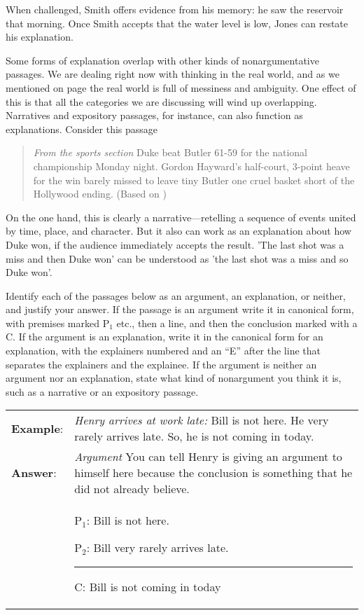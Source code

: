 When challenged, Smith offers evidence from his memory: he saw the reservoir that morning. Once Smith accepts that the water level is low, Jones can restate his explanation.

Some forms of explanation overlap with other kinds of nonargumentative passages. We are dealing right now with thinking in the real world, and as we mentioned on page \pageref{messiness_warning} the real world is full of messiness and ambiguity. One effect of this is that all the categories we are discussing will wind up overlapping. Narratives and expository passages, for instance, can also function as explanations. Consider this passage

\begin{quotation} \noindent\textit{From the sports section} Duke beat Butler 61-59 for the national championship Monday night. Gordon Hayward's half-court, 3-point heave for the win barely missed to leave tiny Butler one cruel basket short of the Hollywood ending. (Based on \cite{AP2010}) \end{quotation}

On the one hand, this is clearly a narrative---retelling a sequence of events united by time, place, and character. But it also can work as an explanation about how Duke won, if the audience immediately accepts the result. 'The last shot was a miss\textit{ }and then Duke won' can be understood as 'the last shot was a miss and so Duke won'.




\practiceproblems 
\problempart Identify each of the passages below as an argument, an explanation, or neither, and justify your answer. If the passage is an argument write it in canonical form, with premises marked P$_1$ etc., then a line, and then the conclusion marked with a C. If the argument is an explanation, write it in the canonical form for an explanation, with the explainers numbered and an ``E'' after the line that separates the explainers and the explainee. If the argument is neither an argument nor an explanation, state what kind of nonargument you think it is, such as a narrative or an expository passage.
 
\begin{longtabu}{p{.1\linewidth}p{.9\linewidth}}
\textbf{Example}: & \textit{Henry arrives at work late: }Bill is not here. He very rarely arrives late. So, he is not coming in today. \\
\textbf{Answer}: & \textit{Argument} You can tell Henry is giving an argument to himself here because the conclusion is something that he did not already believe. \\
&\begin{earg}
\item[P$_1$:] Bill is not here. 
\item[P$_2$:] Bill very rarely arrives late. 
\vspace{-.5em}
\item [] \rule{0.6\linewidth}{.5pt} 
\item[C:] Bill is not coming in today
\end{earg} 
\end{longtabu}


